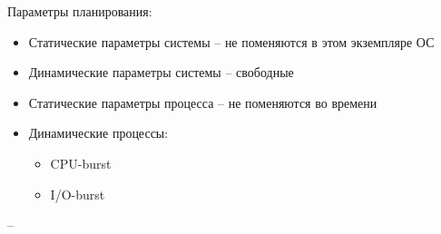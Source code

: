 \documentclass{book}
\theoremstyle{definition}
\begin{document}
Параметры планирования:
\begin{itemize}
    \item Статические параметры системы -- не поменяются в этом экземпляре ОС
    \item Динамические параметры системы -- свободные
    \item Статические параметры процесса -- не поменяются во времени
    \item Динамические процессы:
        \begin{itemize}
            \item CPU-burst
            \item I/O-burst
        \end{itemize}
\end{itemize}
-- 
\end{document}
